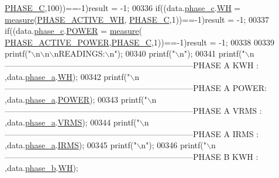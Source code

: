\begin{DoxyCode}
      \hyperlink{a00043_a3ceb83fb10c2af19b468d508448f24e2}{PHASE\_C},100))==-1)result = -1;
00336          \textcolor{keywordflow}{if}((data.\hyperlink{a00029_ad8892f27909cf51f7603adfc00d224df}{phase\_c}.\hyperlink{a00030_a8dd6d8406db4e214238b3eff481e4ea0}{WH}           = \hyperlink{a00009_gac914ebaa64afce03ee852af09659cf69}{measure}(\hyperlink{a00043_a4ee773ad07fa969b9990f9bb3a1a2093}{PHASE\_ACTIVE\_WH},
      \hyperlink{a00043_a3ceb83fb10c2af19b468d508448f24e2}{PHASE\_C},1))==-1)result = -1;
00337          \textcolor{keywordflow}{if}((data.\hyperlink{a00029_ad8892f27909cf51f7603adfc00d224df}{phase\_c}.\hyperlink{a00030_a8a9794fa4c6a69b457d1eb04b017ef1e}{POWER}         = \hyperlink{a00009_gac914ebaa64afce03ee852af09659cf69}{measure}(
      \hyperlink{a00043_abd3f95c7cd63d0627552d293bf49e026}{PHASE\_ACTIVE\_POWER},\hyperlink{a00043_a3ceb83fb10c2af19b468d508448f24e2}{PHASE\_C},1))==-1)result = -1;
00338          
00339         printf(\textcolor{stringliteral}{"\(\backslash\)n\(\backslash\)n\(\backslash\)nREADINGS:\(\backslash\)n"});
00340         printf(\textcolor{stringliteral}{"\(\backslash\)n"});       
00341         printf(\textcolor{stringliteral}{"\(\backslash\)n---------------------------------------------------------------------PHASE A KWH  : %
      ,data.\hyperlink{a00029_ad7205e9853a503d2fab0697f5a301f6c}{phase\_a}.\hyperlink{a00030_a8dd6d8406db4e214238b3eff481e4ea0}{WH});
00342         printf(\textcolor{stringliteral}{"\(\backslash\)n---------------------------------------------------------------------PHASE A POWER: %
      ,data.\hyperlink{a00029_ad7205e9853a503d2fab0697f5a301f6c}{phase\_a}.\hyperlink{a00030_a8a9794fa4c6a69b457d1eb04b017ef1e}{POWER});
00343         printf(\textcolor{stringliteral}{"\(\backslash\)n---------------------------------------------------------------------PHASE A VRMS : %
      ,data.\hyperlink{a00029_ad7205e9853a503d2fab0697f5a301f6c}{phase\_a}.\hyperlink{a00030_a08415029e214174a01bc6487ff98ee9b}{VRMS});
00344         printf(\textcolor{stringliteral}{"\(\backslash\)n---------------------------------------------------------------------PHASE A IRMS : %
      ,data.\hyperlink{a00029_ad7205e9853a503d2fab0697f5a301f6c}{phase\_a}.\hyperlink{a00030_a4f87f30b543e89e2e5dfa1b8f3f58eff}{IRMS});
00345         printf(\textcolor{stringliteral}{"\(\backslash\)n"});
00346         printf(\textcolor{stringliteral}{"\(\backslash\)n---------------------------------------------------------------------PHASE B KWH  : %
      ,data.\hyperlink{a00029_a48734adeb4d59d056b6e39c6e08fe21e}{phase\_b}.\hyperlink{a00030_a8dd6d8406db4e214238b3eff481e4ea0}{WH});
}}}}}
\end{DoxyCode}
